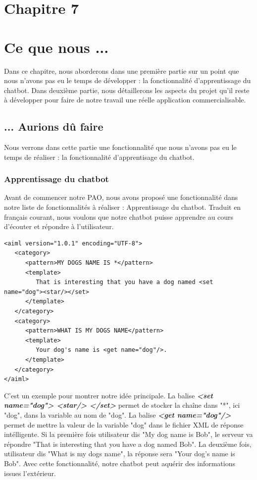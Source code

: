 \section*{Chapitre 7}
\section{Ce que nous ...}
\indent Dans ce chapitre, nous aborderons dans une première partie sur un point que nous n'avons pas eu le temps de développer :  la fonctionnalité d’apprentissage du chatbot. Dans deuxième partie, nous détaillerons les aspects du projet qu'il reste à développer pour faire de notre travail une réelle application commercialisable.

\subsection{... Aurions dû faire}
\indent Nous verrons dans cette partie une fonctionnalité que nous n'avons pas eu le temps de réaliser : la fonctionnalité d'apprentisage du chatbot.

\subsubsection{Apprentissage du chatbot}
\indent Avant de commencer notre PAO, nous avons proposé une fonctionnalité dans notre liste de fonctionnalités à réaliser : Apprentissage du chatbot. Traduit en français courant, nous voulons que notre chatbot puisse apprendre au cours d'écouter et répondre à l'utilisateur. 

\begin{lstlisting}[frame=none,aboveskip=0.5em]
<aiml version="1.0.1" encoding="UTF-8">
   <category>
      <pattern>MY DOGS NAME IS *</pattern>
      <template>
         That is interesting that you have a dog named <set name="dog"><star/></set>
      </template>  
   </category>  
   <category>
      <pattern>WHAT IS MY DOGS NAME</pattern>
      <template>
         Your dog's name is <get name="dog"/>.
      </template>  
   </category>  
</aiml>
\end{lstlisting}

\indent C'est un exemple pour montrer notre idée principale. La balise \textbf{\emph{<set name="dog"> <star/> </set>}} permet de stocker la chaîne dans "*", ici "dog", dans la variable au nom de "dog". La balise \textbf{\emph{<get name="dog"/>}} permet de mettre la valeur de la variable "dog" dans le fichier XML de réponse intélligente. Si la première fois utilisateur dis "My dog name is Bob", le serveur va répondre "That is interesting that you have a dog named Bob". La deuxième fois, utilisateur dis "What is my dogs name", la réponse sera "Your dog's name is Bob". Avec cette fonctionnalité, notre chatbot peut aquérir des informations issues l'extérieur. 

